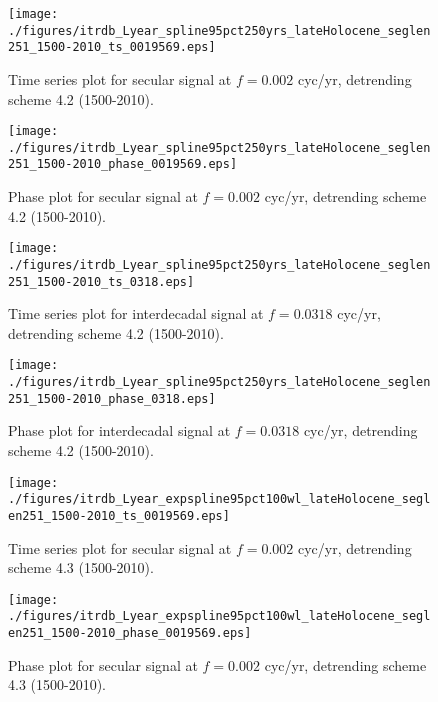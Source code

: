 \documentclass[phd,tocprelim]{cornell}
\begin{document}
\begin{figure}[!tbp]
\centering
\begin{minipage}[b]{0.45\textwidth}
\texttt{[image: ./figures/itrdb\_Lyear\_spline95pct250yrs\_lateHolocene\_seglen251\_1500-2010\_ts\_0019569.eps]}
\caption{Time series plot for secular signal at $f=0.002$ cyc/yr, detrending scheme 4.2 (1500-2010).}
\label{ts4.2pl1}
\end{minipage}
\hfill
\begin{minipage}[b]{0.45\textwidth}
\texttt{[image: ./figures/itrdb\_Lyear\_spline95pct250yrs\_lateHolocene\_seglen251\_1500-2010\_phase\_0019569.eps]}
\caption{Phase plot for secular signal at $f=0.002$ cyc/yr, detrending scheme 4.2 (1500-2010).}
\label{map4.2pl1}
\end{minipage}
\end{figure}

\begin{figure}[!tbp]
\centering
\begin{minipage}[b]{0.45\textwidth}
\texttt{[image: ./figures/itrdb\_Lyear\_spline95pct250yrs\_lateHolocene\_seglen251\_1500-2010\_ts\_0318.eps]}
\caption{Time series plot for interdecadal signal at $f=0.0318$ cyc/yr, detrending scheme 4.2 (1500-2010).}
\label{ts4.2pl2}
\end{minipage}
\hfill
\begin{minipage}[b]{0.45\textwidth}
\texttt{[image: ./figures/itrdb\_Lyear\_spline95pct250yrs\_lateHolocene\_seglen251\_1500-2010\_phase\_0318.eps]}
\caption{Phase plot for interdecadal signal at $f=0.0318$ cyc/yr, detrending scheme 4.2 (1500-2010).}
\label{map4.2pl2}
\end{minipage}
\end{figure}

\begin{figure}[!tbp]
\centering
\begin{minipage}[b]{0.45\textwidth}
\texttt{[image: ./figures/itrdb\_Lyear\_expspline95pct100wl\_lateHolocene\_seglen251\_1500-2010\_ts\_0019569.eps]}
\caption{Time series plot for secular signal at $f=0.002$ cyc/yr, detrending scheme 4.3 (1500-2010).}
\label{ts4.3pl1}
\end{minipage}
\hfill
\begin{minipage}[b]{0.45\textwidth}
\texttt{[image: ./figures/itrdb\_Lyear\_expspline95pct100wl\_lateHolocene\_seglen251\_1500-2010\_phase\_0019569.eps]}
\caption{Phase plot for secular signal at $f=0.002$ cyc/yr, detrending scheme 4.3 (1500-2010).}
\label{map4.3pl1}
\end{minipage}
\end{figure}
\end{document}
